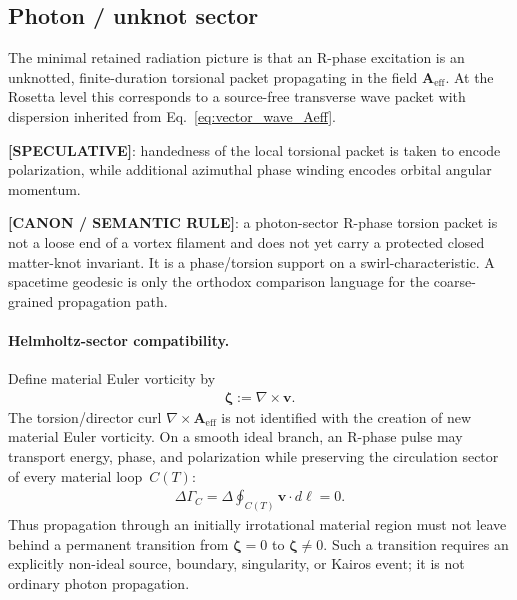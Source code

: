 \documentclass[11pt]{article}
\theoremstyle{definition}
\theoremstyle{plain}
\theoremstyle{remark}
\begin{document}
    \subsection{Photon / unknot sector}

        The minimal retained radiation picture is that an R-phase excitation is an unknotted, finite-duration torsional packet propagating in the field $\mathbf{A}_{\mathrm{eff}}$. At the Rosetta level this corresponds to a source-free transverse wave packet with dispersion inherited from Eq.~\eqref{eq:vector_wave_Aeff}.

        \textbf{[SPECULATIVE]}: handedness of the local torsional packet is taken to encode polarization, while additional azimuthal phase winding encodes orbital angular momentum.

        \textbf{[CANON / SEMANTIC RULE]}:
        a photon-sector R-phase torsion packet is not a loose end of a vortex
        filament and does not yet carry a protected closed matter-knot invariant.
        It is a phase/torsion support on a swirl-characteristic. A spacetime
        geodesic is only the orthodox comparison language for the coarse-grained
        propagation path.

        \paragraph{Helmholtz-sector compatibility.}
        Define material Euler vorticity by
        \begin{align}
            \boldsymbol{\zeta}
            :=
            \nabla\times\mathbf v .
        \end{align}
        The torsion/director curl \(\nabla\times\mathbf A_{\mathrm{eff}}\) is not identified with the creation of new material Euler vorticity. On a smooth ideal branch, an R-phase pulse may transport energy, phase, and polarization while preserving the circulation sector of every material loop~\(C(T)\):
        \begin{align}
            \Delta\Gamma_C
            =
            \Delta\oint_{C(T)}\mathbf v\cdot d\boldsymbol\ell
            =0.
            \label{eq:r_phase_helmholtz_sector_gate}
        \end{align}
        Thus propagation through an initially irrotational material region must not leave behind a permanent transition from \(\boldsymbol\zeta=0\) to \(\boldsymbol\zeta\neq0\). Such a transition requires an explicitly non-ideal source, boundary, singularity, or Kairos event; it is not ordinary photon propagation.
\end{document}
